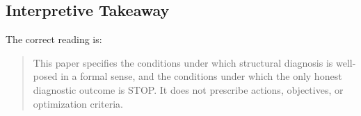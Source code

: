\subsection{Interpretive Takeaway}
\label{subsec:takeaway}

The correct reading is:

\begin{quote}
This paper specifies the conditions under which structural diagnosis is
well-posed in a formal sense, and the conditions under which the only honest
diagnostic outcome is STOP.
It does not prescribe actions, objectives, or optimization criteria.
\end{quote}
